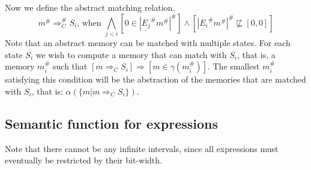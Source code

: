 \documentclass[fleqn]{article}
\theoremstyle{definition}
\begin{document}
Now we define the abstract matching relation.
\[
m^{\#}\Rightarrow^{\#}_{C}S_{i}\text{, when }\bigwedge_{j<i}[0\in|\underline{E_{j}}^{\#}m^{\#}|^{\#}]\wedge[|\underline{E_{i}}^{\#}m^{\#}|^{\#}\not\sqsubseteq [0,0]]
\]
Note that an abstract memory can be matched with multiple states. For each state $S_{i}$ we wish to compute a memory that can match with $S_{i}$, that is, a memory $m_{i}^{\#}$ such that $[m\Rightarrow_{C}S_{i}]\Rightarrow[m\in\gamma(m_{i}^{\#})]$. The smallest $m_{i}^{\#}$ satisfying this condition will be the abstraction of the memories that are matched with $S_{i}$, that is: $\alpha(\{m|m\Rightarrow_{C}S_{i}\})$.
\subsection{Semantic function for expressions}

Note that there cannot be any infinite intervals, since all expressions must eventually be restricted by their bit-width.
\end{document}
